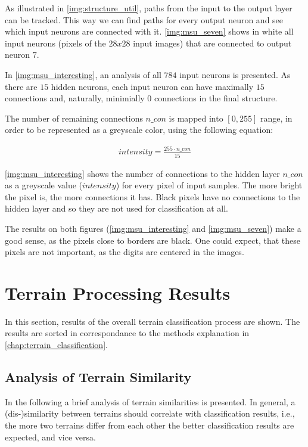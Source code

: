 As illustrated in \cref{img:structure_util}, paths from the input to the output layer can be tracked. This way we can find paths for every output neuron and see which input neurons are connected with it. \cref{img:msu_seven} shows in white all input neurons (pixels of the $ 28x28 $ input images) that are connected to output neuron $ 7 $.

In \cref{img:msu_interesting}, an analysis of all $ 784 $ input neurons is presented. As there are $ 15 $ hidden neurons, each input neuron can have maximally $ 15 $ connections and, naturally, minimially $ 0 $ connections in the final structure. 

The number of remaining connections $ n\_con $ is mapped into $ [0, 255] $ range, in order to be represented as a greyscale color, using the following equation:

\begin{align} \label{eq:grayscale_mapping}
intensity = \frac{255 \cdot n\_con}{15}
\end{align}

\cref{img:msu_interesting} shows the number of connections to the hidden layer $ n\_con $ as a greyscale value ($ intensity $) for every pixel of input samples. The more bright the pixel is, the more connections it has. Black pixels have no connections to the hidden layer and so they are not used for classification at all.

The results on both figures (\ref{img:msu_interesting} and \ref{img:msu_seven}) make a good sense, as the pixels close to borders are black. One could expect, that these pixels are not important, as the digits are centered in the images.

\section{Terrain Processing Results} \label{sec:terrain_processing_results}
In this section, results of the overall terrain classification process are shown. The results are sorted in correspondance to the methods explanation in \cref{chap:terrain_classification}.

\subsection{Analysis of Terrain Similarity} \label{ssec:terrains_analysis}
In the following a brief analysis of terrain similarities is presented. In general, a (dis-)similarity between terrains should correlate with classification results, i.e., the more two terrains differ from each other the better classification results are expected, and vice versa.

